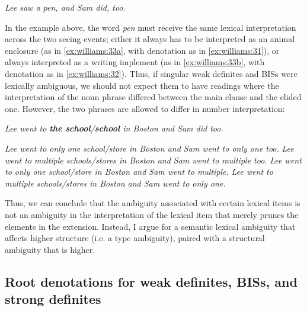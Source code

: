 \documentclass[output=paper,
modfonts
]{langscibook}
\begin{document}
\begin{exe}
	\ex \label{ex:williams:33}
	\textit{Lee saw a pen, and Sam did, too.}
	\begin{xlist}
	\end{xlist}
\end{exe} 

In the example above, the word \textit{pen} must receive the same lexical interpretation across the two seeing events; either it always has to be interpreted as an animal enclosure (as in \ref{ex:williams:33a}, with denotation as in \ref{ex:williams:31}), or always interpreted as a writing implement (as in \ref{ex:williams:33b}, with denotation as in \ref{ex:williams:32}). Thus, if singular weak definites and BISs were lexically ambiguous, we should not expect them to have readings where the  interpretation of the noun phrase differed between the main clause and the elided one. However, the two phrases are allowed to differ in number interpretation:

\begin{exe}
	\ex \textit{Lee went to \textbf{the school}/\textbf{school} in Boston and Sam did too.}
	\begin{xlist}
	\ex \textit{Lee went to only one school/store in Boston and Sam went to only one too.}
	\ex \textit{Lee went to multiple schools/stores in Boston and Sam went to  multiple too.}
	\ex \textit{Lee went to only one school/store in Boston and Sam went to multiple.} \largerpage[2]
	\ex \textit{Lee went to multiple schools/stores in Boston and Sam went to only one.}
	\end{xlist}
\end{exe}

Thus, we can conclude that the ambiguity associated with certain lexical items is not an ambiguity in the interpretation of the lexical item that merely prunes the elements in the extension. Instead, I argue for a semantic lexical ambiguity that affects higher structure (i.e. a type ambiguity), paired with a structural ambiguity that is higher. 

\subsection{Root denotations for weak definites, BISs, and strong definites}
\end{document}

